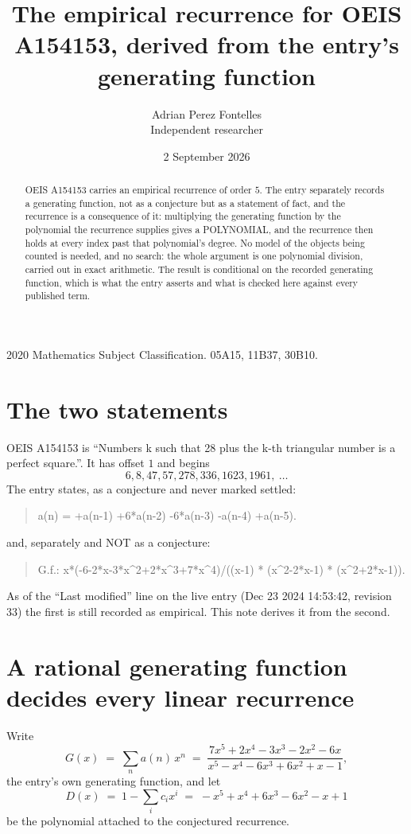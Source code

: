 \documentclass[11pt,a4paper]{article}
\title{The empirical recurrence for OEIS A154153, derived from the entry's generating function}
\author{Adrian Perez Fontelles\\ \small Independent researcher}
\date{2 September 2026}
\theoremstyle{plain}
\theoremstyle{definition}
\begin{document}
\maketitle

\begin{abstract}
OEIS A154153 carries an empirical recurrence of order $5$. The entry separately records a
generating function, not as a conjecture but as a statement of fact, and the recurrence is a
consequence of it: multiplying the generating function by the polynomial the recurrence
supplies gives a POLYNOMIAL, and the recurrence then holds at every index past that
polynomial's degree. No model of the objects being counted is needed, and no search: the
whole argument is one polynomial division, carried out in exact arithmetic. The result is
conditional on the recorded generating function, which is what the entry asserts and what is
checked here against every published term.
\end{abstract}

\noindent\small 2020 Mathematics Subject Classification. 05A15, 11B37, 30B10.\normalsize

\section{The two statements}

OEIS A154153 is ``Numbers k such that 28 plus the k-th triangular number is a perfect square.''. It has offset $1$ and begins
\[
6, 8, 47, 57, 278, 336, 1623, 1961,\ \dots
\]
The entry states, as a conjecture and never marked settled:
\begin{quote}
a(n) = +a(n-1) +6*a(n-2) -6*a(n-3) -a(n-4) +a(n-5).
\end{quote}
and, separately and NOT as a conjecture:
\begin{quote}
G.f.: x*(-6-2*x-3*x\^{}2+2*x\^{}3+7*x\^{}4)/((x-1) * (x\^{}2-2*x-1) * (x\^{}2+2*x-1)).
\end{quote}
As of the ``Last modified'' line on the live entry (Dec 23 2024 14:53:42, revision 33) the first is still
recorded as empirical. This note derives it from the second.

\section{A rational generating function decides every linear recurrence}

Write
\[
G(x)\;=\;\sum_{n}a(n)\,x^{n}\;=\;\frac{7 x^{5} + 2 x^{4} - 3 x^{3} - 2 x^{2} - 6 x}{x^{5} - x^{4} - 6 x^{3} + 6 x^{2} + x - 1},
\]
the entry's own generating function, and let
\[
D(x)\;=\;1-\sum_i c_i x^{i}\;=\;- x^{5} + x^{4} + 6 x^{3} - 6 x^{2} - x + 1
\]
be the polynomial attached to the conjectured recurrence.
\end{document}
